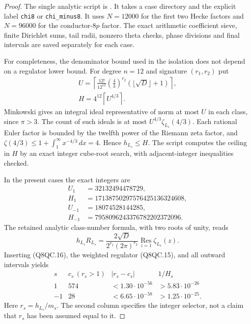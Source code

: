 \begin{proof}
The single analytic script is
.
It takes a case directory and the explicit label
\texttt{chi8} or \texttt{chi\_minus8}.
It uses $N=12000$ for the first two Hecke factors and $N=96000$
for the conductor-$8p$ factor.
The exact arithmetic coefficient sieve, finite Dirichlet sums,
tail radii, nonzero theta checks, phase divisions and final
intervals are saved separately for each case.

For completeness, the denominator bound used in the isolation
does not depend on a regulator lower bound.
For degree $n=12$ and signature $(r_1,r_2)$ put
\[
 \begin{gathered}
 U=\left\lceil
 \frac{12!}{12^{12}}\left(\frac43\right)^{r_2}
                     (\lfloor\sqrt D\rfloor+1)\right\rceil,\\
 H=4^{12}\left\lceil U^{4/3}\right\rceil .
 \end{gathered}
 \tag{Q8QC.28}
\]
Minkowski gives an integral ideal representative of norm at most
$U$ in each class, since $\pi>3$.
The count of such ideals is at most
$U^{4/3}\zeta_{L_s}(4/3)$.
Each rational Euler factor is bounded by the twelfth power of
the Riemann zeta factor, and
$\zeta(4/3)\leq1+\int_1^\infty x^{-4/3}\,dx=4$.
Hence $h_{L_s}\leq H$.
The script computes the ceiling in $H$ by an exact integer
cube-root search, with adjacent-integer inequalities checked.

In the present cases the exact integers are
\[
 \begin{aligned}
 U_1&=32132494478729,\\
 H_1&=17138750297576425136324608,\\
 U_{-1}&=18074528144285,\\
 H_{-1}&=7958096243376782202372096.
 \end{aligned}
 \tag{Q8QC.29}
\]
The retained analytic class-number formula, with two roots of
unity, reads
\[
 h_{L_s}R_{L_s}
   =\frac{2\sqrt D}{2^{r_1}(2\pi)^{r_2}}
                      \operatorname*{Res}_{z=1}\zeta_{L_s}(z).
 \tag{Q8QC.30}
\]
Inserting (Q8QC.16), the weighted regulator (Q8QC.15), and all
outward intervals yields
\[
 \begin{array}{c|c|c|c}
 s&c_s\ (r_s>1)&|r_s-c_s|&1/H_s\\ \hline
 1&574&<1.30\cdot10^{-56}&>5.83\cdot10^{-26}\\
 -1&28&<6.65\cdot10^{-58}&>1.25\cdot10^{-25}.
 \end{array}
 \tag{Q8QC.31}
\]
Here $r_s=h_{L_s}/m_s$.  The second column specifies the integer
selector, not a claim
that $r_s$ has been assumed equal to it.


\end{proof}
